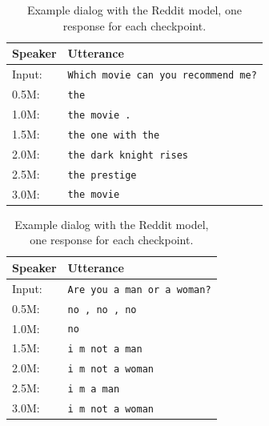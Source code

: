 \begin{table}[H]
	\centering
	\begin{adjustbox}{max width=\textwidth}
		\begin{tabular}{ll}
			\toprule
			Speaker & Utterance\\ \midrule
			Input: 	& \texttt{Which movie can you recommend me?}\\
			0.5M: 	& \texttt{the}\\
			1.0M: 	& \texttt{the movie .}\\
			1.5M:	& \texttt{the one with the}\\
			2.0M:	& \texttt{the dark knight rises}\\
			2.5M:	& \texttt{the prestige}\\
			3.0M:	& \texttt{the movie}\\
			\bottomrule
		\end{tabular}
	\end{adjustbox}
	\caption{Example dialog with the Reddit model, one response for each checkpoint.}
	\label{results:example_output2:reddit}
\end{table}

\begin{table}[H]
	\centering
	\begin{adjustbox}{max width=\textwidth}
		\begin{tabular}{ll}
			\toprule
			Speaker & Utterance\\ \midrule
			Input: 	& \texttt{Are you a man or a woman?}\\
			0.5M: 	& \texttt{no , no , no}\\
			1.0M: 	& \texttt{no}\\
			1.5M:	& \texttt{i m not a man}\\
			2.0M:	& \texttt{i m not a woman}\\
			2.5M:	& \texttt{i m a man}\\
			3.0M:	& \texttt{i m not a woman}\\
			\bottomrule
		\end{tabular}
	\end{adjustbox}
	\caption{Example dialog with the Reddit model, one response for each checkpoint.}
	\label{results:example_output1:OpenSubtitle}
\end{table}

